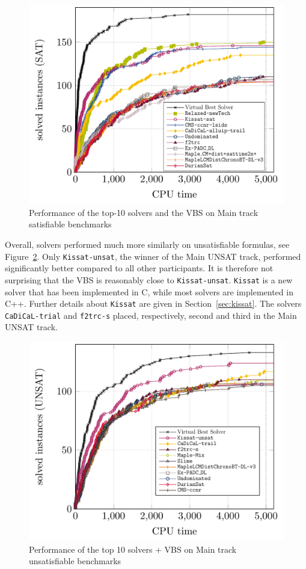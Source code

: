 \documentclass{elsarticle}
\newcommand{\solver}[1]{\texttt{#1}}
\begin{document}
\begin{figure}[ht]
\centering
\includegraphics[width=.9\textwidth]{img/paper-main-top10-SAT.pdf}
\caption{Performance of the top-10 solvers and the VBS on Main track satisfiable benchmarks}
\label{main:sat}
\end{figure}


Overall, solvers performed much more similarly on
unsatisfiable formulas,
see Figure~\ref{main:unsat}. Only \solver{Kissat-unsat}, the winner of the Main UNSAT track, 
performed significantly better compared to all other participants. It is therefore not surprising
that the VBS is reasonably close to \solver{Kissat-unsat}. \solver{Kissat} is a new solver that has been implemented in C, while most solvers are implemented in C++. Further 
details about \solver{Kissat} are given in Section~\ref{sec:kissat}.
The solvers \solver{CaDiCaL-trial}
and \solver{f2trc-s} placed, respectively, second and third in the Main UNSAT track.

\begin{figure}[ht]
\centering
\includegraphics[width=.9\textwidth]{img/paper-main-top10-UNSAT.pdf}
\caption{Performance of the top 10 solvers + VBS on Main track unsatisfiable benchmarks}
\label{main:unsat}
\end{figure}
\end{document}
